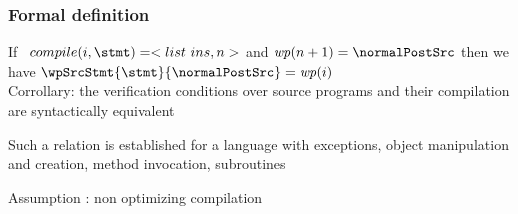 \documentclass{beamer}
\begin{document}
\begin{frame}\frametitle{Formal definition}
\begin{theorem}
  If \  $compile(i, \stmt) = <list \ ins, n>  $ and  $\wpi(n+1) = \normalPostSrc$  then  we have 
      $ \wpSrcStmt{ \stmt}{\normalPostSrc }  = \wpi(i)  $
\\
\vspace{3ex} Corrollary:
 the verification conditions over  source programs and their compilation are syntactically equivalent 
   
 \end{theorem}
  Such a relation is established for a language with exceptions, object manipulation and creation, method invocation, subroutines
 
  Assumption : non optimizing compilation 

\end{frame}
\end{document}
